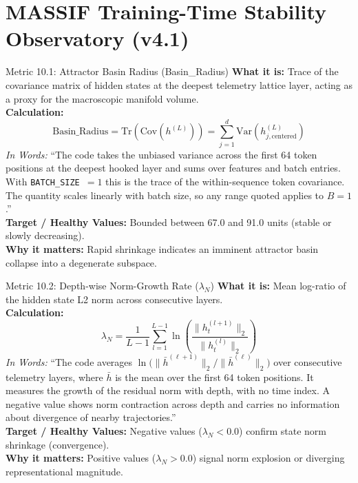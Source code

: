 \documentclass[11pt,a4paper]{article}
\begin{document}
\section{MASSIF Training-Time Stability Observatory (v4.1)}

\begin{metricbox}{Metric 10.1: Attractor Basin Radius (Basin\_Radius)}
\textbf{What it is:} Trace of the covariance matrix of hidden states at the deepest telemetry lattice layer, acting as a proxy for the macroscopic manifold volume.\\
\textbf{Calculation:} 
 $$\text{Basin\_Radius} = \text{Tr}\left(\text{Cov}(h^{(L)})\right) = \sum_{j=1}^d \text{Var}(h_{j, \text{centered}}^{(L)})$$ \emph{In Words:} ``The code takes the unbiased variance across the first 64 token positions at the deepest hooked layer and sums over features and batch entries. With \texttt{BATCH\_SIZE}~$=1$ this is the trace of the within-sequence token covariance. The quantity scales linearly with batch size, so any range quoted applies to $B=1$.''\\
\textbf{Target / Healthy Values:} Bounded between 67.0 and 91.0 units (stable or slowly decreasing).\\
\textbf{Why it matters:} Rapid shrinkage indicates an imminent attractor basin collapse into a degenerate subspace.
\end{metricbox}

\begin{metricbox}{Metric 10.2: Depth-wise Norm-Growth Rate ($\lambda_N$)}
\textbf{What it is:} Mean log-ratio of the hidden state L2 norm across consecutive layers.\\
\textbf{Calculation:} 
 $$\lambda_N = \frac{1}{L-1} \sum_{l=1}^{L-1} \ln \left( \frac{\|h_{t}^{(l+1)}\|_2}{\|h_{t}^{(l)}\|_2} \right)$$ \emph{In Words:} ``The code averages $\ln\!\big(\|\bar h^{(\ell+1)}\|_2/\|\bar h^{(\ell)}\|_2\big)$ over consecutive telemetry layers, where $\bar h$ is the mean over the first 64 token positions. It measures the growth of the residual norm with depth, with no time index. A negative value shows norm contraction across depth and carries no information about divergence of nearby trajectories.''\\
\textbf{Target / Healthy Values:} Negative values ($\lambda_N < 0.0$) confirm state norm shrinkage (convergence).\\
\textbf{Why it matters:} Positive values ($\lambda_N > 0.0$) signal norm explosion or diverging representational magnitude.
\end{metricbox}
\end{document}
